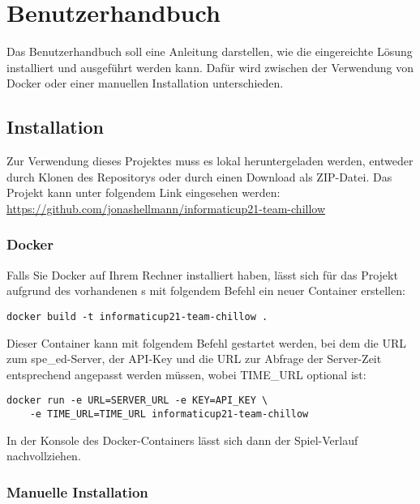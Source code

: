 \chapter{Benutzerhandbuch}
\label{ch:benutzerhandbuch}

Das Benutzerhandbuch soll eine Anleitung darstellen, wie die eingereichte Lösung installiert und ausgeführt werden kann.
Dafür wird zwischen der Verwendung von Docker oder einer manuellen Installation unterschieden.

\section{Installation}
\label{sec:installation}

Zur Verwendung dieses Projektes muss es lokal heruntergeladen werden, entweder durch Klonen des Repositorys oder durch
einen Download als ZIP-Datei.
Das Projekt kann unter folgendem Link eingesehen werden:
\url{https://github.com/jonashellmann/informaticup21-team-chillow}

\subsection{Docker}
\label{subsec:docker}

Falls Sie Docker auf Ihrem Rechner installiert haben, lässt sich für das Projekt aufgrund des vorhandenen
s mit folgendem Befehl ein neuer Container erstellen:

\begin{verbatim}
docker build -t informaticup21-team-chillow .
\end{verbatim}

Dieser Container kann mit folgendem Befehl gestartet werden, bei dem die URL zum spe\_ed-Server, der API-Key und die URL
zur Abfrage der Server-Zeit entsprechend angepasst werden müssen, wobei TIME\_URL optional ist:

\begin{verbatim}
docker run -e URL=SERVER_URL -e KEY=API_KEY \
    -e TIME_URL=TIME_URL informaticup21-team-chillow
\end{verbatim}

In der Konsole des Docker-Containers lässt sich dann der Spiel-Verlauf nachvollziehen.

\subsection{Manuelle Installation}
\label{subsec:manuelle-installation}

